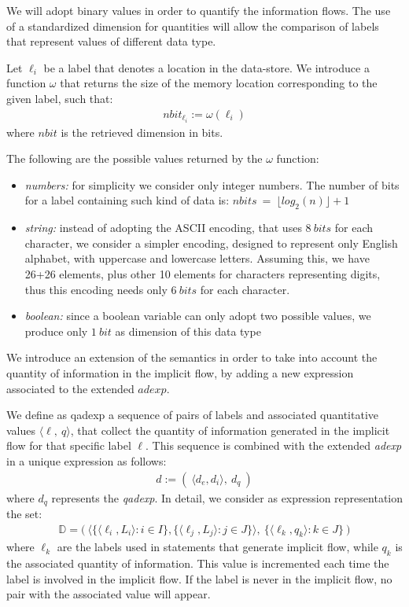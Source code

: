 \documentclass{llncs}
\newcommand{\blangle}{\big\langle}
\newcommand{\brangle}{\big\rangle}
\begin{document}
We will adopt binary values in order to quantify the information flows. The use of a standardized dimension for quantities will allow the comparison of labels that represent values of different data type.

\begin{definition}\label{lab_dim}
Let $\ell_i$ be a label that denotes a location in the data-store. We introduce a function $\omega$ that returns the size of the memory location corresponding to the given label, such that:
\begin{align*}
nbit_{\ell_i}:=\omega(\ell_i)
\end{align*}
where $nbit$ is the retrieved dimension in bits.
\end{definition}
The following are the possible values returned by the $\omega$ function:
\begin{itemize}
\item \emph{numbers:} for simplicity we consider only integer numbers. The number of bits for a label containing such kind of data is: $nbits\ =\ \lfloor log_2(n)\rfloor + 1$
\item \emph{string:}	instead of adopting the ASCII encoding, that uses $8\ bits$ for each character, we consider a simpler encoding, designed to represent only English alphabet, with uppercase and lowercase letters. Assuming this, we have 26+26 elements, plus other 10 elements for characters representing digits, thus this encoding needs only $6\ bits$ for each character.
\item \emph{boolean:} since a boolean variable can only adopt two possible values, we produce only $1\ bit$ as dimension of this data type
\end{itemize}


We introduce  an extension of the semantics in order to take into account the quantity of information in the implicit flow, by adding a new expression associated to the extended $adexp$. 

\begin{definition}\label{qadexp_def}
We define as \textnormal{qadexp} a sequence of pairs of labels and associated quantitative values $\langle\ell,\ q\rangle$, that collect the quantity of information generated in the implicit flow for that specific label $\ell$. This sequence is combined with the extended \emph{adexp} in a unique expression as follows: 
\begin{align*}
d:=(\ \langle d_e, d_i \rangle ,\ d_q\ )
\end{align*}
where $d_q$ represents the \emph{qadexp}. In detail, we consider as expression representation the set:
\begin{align*}
\mathds{D}= \big (\ \blangle\{\langle \ell_i, L_i\rangle : i \in I\}, \{\langle \ell_j, L_j\rangle : j \in J\}\brangle,\ \{\langle \ell_k, q_k \rangle:k\in J \}\ \big )
\end{align*}
where $\ell_k$ are the labels used in statements that generate implicit flow, while $q_k$ is the associated quantity of information. This value is incremented each time the label is involved in the implicit flow. If the label is never in the implicit flow, no pair with the associated value will appear. 
\end{definition}
\end{document}
